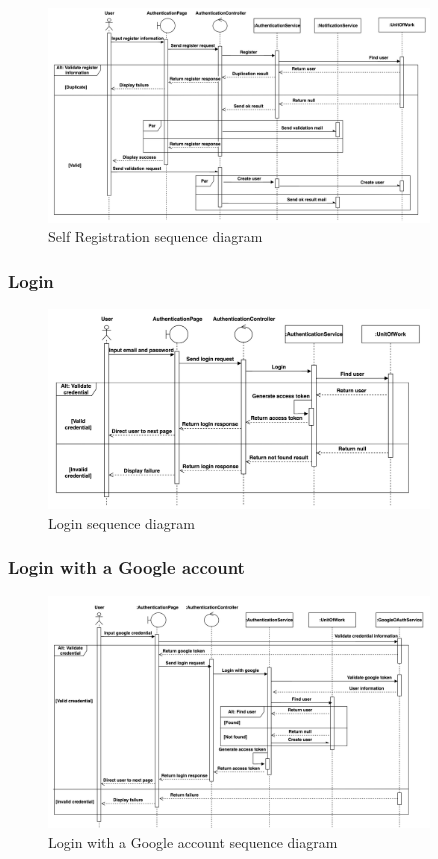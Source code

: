 \begin{figure}[H]
  \centering
  \includegraphics[width=0.9\textwidth]{Figures/self_register_seq.png}
  \caption{Self Registration sequence diagram}
  \label{fig:self-registration-seq}
\end{figure}


\subsubsection{Login}

\begin{figure}[H]
  \centering
  \includegraphics[width=0.9\textwidth]{Figures/login_seq.png}
  \caption{Login sequence diagram}
  \label{fig:login-seq}
\end{figure}
\clearpage
\subsubsection{Login with a Google account}

\begin{figure}[H]
  \centering
  \includegraphics[width=0.9\textwidth]{Figures/login_gg_seq.png}
  \caption{Login with a Google account sequence diagram}
  \label{fig:login-google-seq}
\end{figure}

